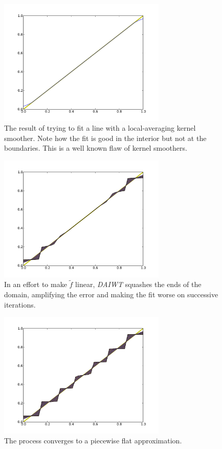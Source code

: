 \begin{figure}[!!!ht]
  \centering
    \includegraphics[width=80mm]{figs/linefit.pdf}
  \caption[Fitting a line with a kernel smoother]
  {The result of trying to fit a line with a local-averaging kernel
    smoother.
    Note how the fit is good in the interior but not at the boundaries.
    This is a well known flaw of kernel smoothers.}
  \label{fig:linefit}
\end{figure}

\begin{figure}[!!!ht]
  \centering
    \includegraphics[width=80mm]{figs/linefitmid.pdf}
  \caption[Line fit error getting amplified]
  {In an effort to make $\tilde f$ linear, \textit{DAIWT} squashes
    the ends of the domain, amplifying the error and making the fit
	worse on successive iterations.}
  \label{fig:linefitmid}
\end{figure}

\begin{figure}[!!!ht]
  \centering
    \includegraphics[width=80mm]{figs/linefitend.pdf}
  \caption[Fixed point of FIIRA]
{The process converges to a piecewise flat approximation.}
  \label{fig:linefitend}
\end{figure}

